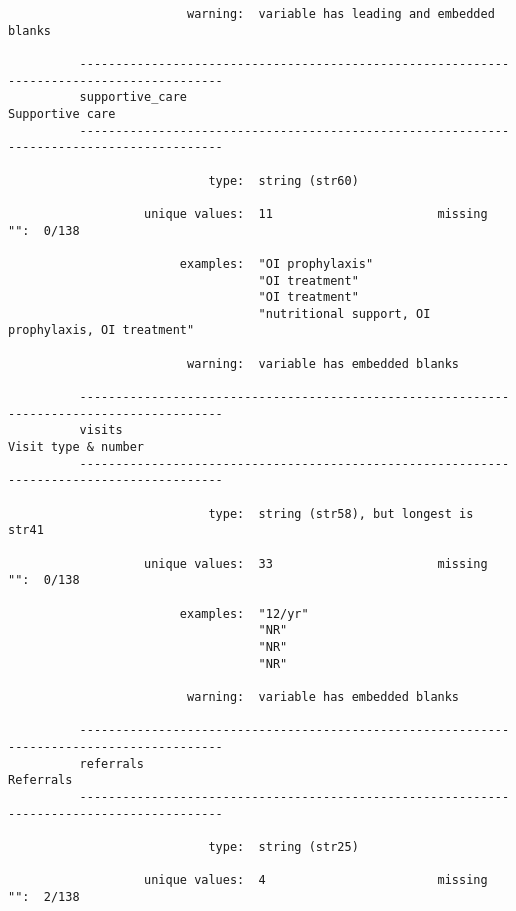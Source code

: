 \documentclass{article}
\begin{document}
\begin{verbatim}
                         warning:  variable has leading and embedded blanks
          
          ------------------------------------------------------------------------------------------
          supportive_care                                                            Supportive care
          ------------------------------------------------------------------------------------------
          
                            type:  string (str60)
          
                   unique values:  11                       missing "":  0/138
          
                        examples:  "OI prophylaxis"
                                   "OI treatment"
                                   "OI treatment"
                                   "nutritional support, OI prophylaxis, OI treatment"
          
                         warning:  variable has embedded blanks
          
          ------------------------------------------------------------------------------------------
          visits                                                                 Visit type & number
          ------------------------------------------------------------------------------------------
          
                            type:  string (str58), but longest is str41
          
                   unique values:  33                       missing "":  0/138
          
                        examples:  "12/yr"
                                   "NR"
                                   "NR"
                                   "NR"
          
                         warning:  variable has embedded blanks
          
          ------------------------------------------------------------------------------------------
          referrals                                                                        Referrals
          ------------------------------------------------------------------------------------------
          
                            type:  string (str25)
          
                   unique values:  4                        missing "":  2/138
          

\end{verbatim}
\end{document}
